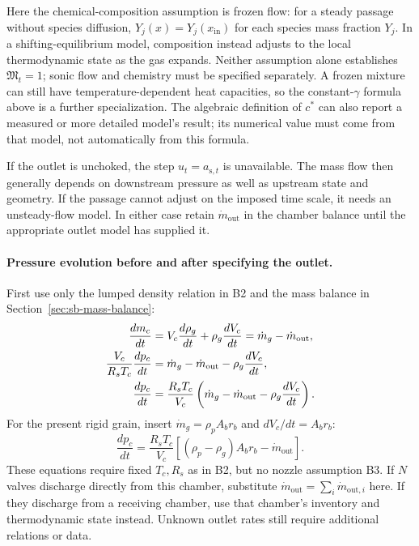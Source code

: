 Here the chemical-composition assumption is frozen flow:
for a steady passage without species diffusion,
$Y_j(x)=Y_j(x_{\mathrm{in}})$ for each species mass fraction $Y_j$.
In a shifting-equilibrium model, composition instead adjusts to the
local thermodynamic state as the gas expands. Neither assumption
alone establishes $\mathfrak M_t=1$; sonic flow and chemistry must be specified
separately. A frozen mixture can still have temperature-dependent
heat capacities, so the constant-$\gamma$ formula above is a further
specialization. The algebraic definition of $c^*$ can also report a
measured or more detailed model's result; its numerical value must
come from that model, not automatically from this formula.

If the outlet is unchoked, the step $u_t=a_{\mathrm{s},t}$ is unavailable.
The mass flow then generally depends on downstream pressure as well
as upstream state and geometry. If the passage cannot adjust on the
imposed time scale, it needs an unsteady-flow model. In either case
retain $\dot m_{\mathrm{out}}$ in the chamber balance until the
appropriate outlet model has supplied it.

\paragraph{Pressure evolution before and after specifying the outlet.}
First use only the lumped density relation in B2 and the mass balance
in Section~\ref{sec:sb-mass-balance}:
\begin{align}
 \frac{dm_c}{dt}
 &=V_c\frac{d\rho_g}{dt}+\rho_g\frac{dV_c}{dt}
  =\dot m_g-\dot m_{\mathrm{out}},\notag\\
 \frac{V_c}{R_sT_c}\frac{dp_c}{dt}
 &=\dot m_g-\dot m_{\mathrm{out}}
      -\rho_g\frac{dV_c}{dt},\notag\\
 \frac{dp_c}{dt}
 &=\frac{R_sT_c}{V_c}
   \left(\dot m_g-\dot m_{\mathrm{out}}
                     -\rho_g\frac{dV_c}{dt}\right).
   \label{eq:sb-general-pressure-outlet}
\end{align}
For the present rigid grain, insert
$\dot m_g=\rho_pA_b r_b$ and $dV_c/dt=A_b r_b$:
\[
 \frac{dp_c}{dt}
 =\frac{R_sT_c}{V_c}
   \left[(\rho_p-\rho_g)A_b r_b-\dot m_{\mathrm{out}}\right].
\]
These equations require fixed $T_c,R_s$ as in B2, but no nozzle
assumption B3. If $N$ valves discharge directly from this chamber,
substitute $\dot m_{\mathrm{out}}=\sum_i\dot m_{\mathrm{out},i}$ here.
If they discharge from a receiving chamber, use that chamber's
inventory and thermodynamic state instead. Unknown outlet rates
still require additional relations or data.

